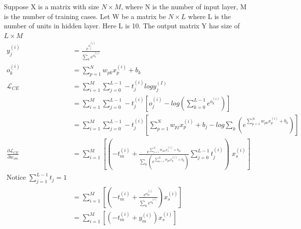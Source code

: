 \documentclass[12pt]{article}
\begin{document}
Suppose X is a matrix with size $N\times M$, where N is the number of input layer, M is the number of training cases. Let W be a matrix be $N\times L$ where L is the number of units in hidden layer. Here L is 10. The output matrix Y has size of $L\times M$
\begin{align}
    y_j^{(i)} &= \frac{e^{o_j^{(i)}}}{\sum_k e^{o_k^{(i)}}}\\
    o_k^{(i)} &= \sum_{p=1}^{N}w_{pk}x_p^{(i)}+b_k\\
    \mathcal{L}_{CE} 
    &= \sum_{i=1}^M \sum_{j=0}^{L-1} -t_j^{(i)}logy_j^{(I)}\\
    &= \sum_{i=1}^M \sum_{j=0}^{L-1} -t_j^{(i)}[o_j^{(i)}-log(\sum_{k=0}^{L-1} e^{o_k^{(i)}})]\\
    &= \sum_{i=1}^M \sum_{j=0}^{L-1} -t_j^{(i)}[\sum_{p=1}^{N}w_{pj}x_p^{(i)}+b_j - log\sum_k (e^{\sum_{p=1}^{N}w_{pk}x_p^{(i)}+b_k})]\\
    \frac{\partial \mathcal{L}_{CE}}{\partial w_{sm}}
    &= \sum_{i=1}^M [(-t_m^{(i)} + \frac{e^{\sum_{s=1}^{N}w_{sm}x_s^{(i)}+b_m}}{\sum_k (e^{\sum_{p=1}^{N}w_{pk}x_p^{(i)}+b_k})}\sum_{j=0}^{L-1} t_j^{(i)})\,\,x_s^{(i)}]\\ \text{Notice $\sum_{j=1}^{L-1} t_j = 1$}\\
    &= \sum_{i=1}^M [(-t_m^{(i)} + \frac{e^{o_m^{(i)}}}{\sum_k e^{o_k^{(i)}}})x_s^{(i)}]\\
    &= \sum_{i=1}^M [(-t_m^{(i)} + y_m^{(i)})x_s^{(i)}]
\end{align}
\end{document}
